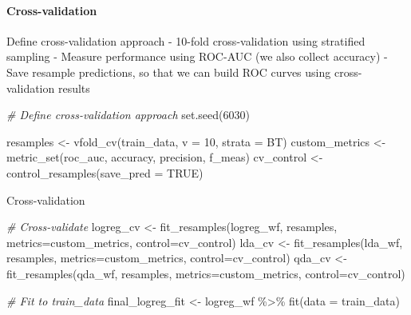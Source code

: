 \documentclass[
]{article}
\newenvironment{Shaded}{\begin{snugshade}}{\end{snugshade}}
\newcommand{\AttributeTok}[1]{\textcolor[rgb]{0.77,0.63,0.00}{#1}}
\newcommand{\CommentTok}[1]{\textcolor[rgb]{0.56,0.35,0.01}{\textit{#1}}}
\newcommand{\ConstantTok}[1]{\textcolor[rgb]{0.00,0.00,0.00}{#1}}
\newcommand{\DecValTok}[1]{\textcolor[rgb]{0.00,0.00,0.81}{#1}}
\newcommand{\FunctionTok}[1]{\textcolor[rgb]{0.00,0.00,0.00}{#1}}
\newcommand{\NormalTok}[1]{#1}
\newcommand{\OtherTok}[1]{\textcolor[rgb]{0.56,0.35,0.01}{#1}}
\newcommand{\SpecialCharTok}[1]{\textcolor[rgb]{0.00,0.00,0.00}{#1}}
\begin{document}
\hypertarget{cross-validation}{%
\paragraph{Cross-validation}\label{cross-validation}}

Define cross-validation approach - 10-fold cross-validation using
stratified sampling - Measure performance using ROC-AUC (we also collect
accuracy) - Save resample predictions, so that we can build ROC curves
using cross-validation results

\begin{Shaded}
\begin{Highlighting}[]
\CommentTok{\# Define cross{-}validation approach}
\FunctionTok{set.seed}\NormalTok{(}\DecValTok{6030}\NormalTok{)}

\NormalTok{resamples }\OtherTok{\textless{}{-}} \FunctionTok{vfold\_cv}\NormalTok{(train\_data, }\AttributeTok{v =} \DecValTok{10}\NormalTok{, }\AttributeTok{strata =}\NormalTok{ BT)}
\NormalTok{custom\_metrics }\OtherTok{\textless{}{-}} \FunctionTok{metric\_set}\NormalTok{(roc\_auc, accuracy, precision, f\_meas)}
\NormalTok{cv\_control }\OtherTok{\textless{}{-}} \FunctionTok{control\_resamples}\NormalTok{(}\AttributeTok{save\_pred =} \ConstantTok{TRUE}\NormalTok{)}
\end{Highlighting}
\end{Shaded}

Cross-validation

\begin{Shaded}
\begin{Highlighting}[]
\CommentTok{\# Cross{-}validate}
\NormalTok{logreg\_cv }\OtherTok{\textless{}{-}} \FunctionTok{fit\_resamples}\NormalTok{(logreg\_wf, resamples, }\AttributeTok{metrics=}\NormalTok{custom\_metrics, }\AttributeTok{control=}\NormalTok{cv\_control)}
\NormalTok{lda\_cv }\OtherTok{\textless{}{-}} \FunctionTok{fit\_resamples}\NormalTok{(lda\_wf, resamples, }\AttributeTok{metrics=}\NormalTok{custom\_metrics, }\AttributeTok{control=}\NormalTok{cv\_control)}
\NormalTok{qda\_cv }\OtherTok{\textless{}{-}} \FunctionTok{fit\_resamples}\NormalTok{(qda\_wf, resamples, }\AttributeTok{metrics=}\NormalTok{custom\_metrics, }\AttributeTok{control=}\NormalTok{cv\_control)}
\end{Highlighting}
\end{Shaded}

\begin{Shaded}
\begin{Highlighting}[]
\CommentTok{\# Fit to train\_data}
\NormalTok{final\_logreg\_fit }\OtherTok{\textless{}{-}}\NormalTok{ logreg\_wf }\SpecialCharTok{\%\textgreater{}\%} \FunctionTok{fit}\NormalTok{(}\AttributeTok{data =}\NormalTok{ train\_data)}
\end{Highlighting}
\end{Shaded}
\end{document}
